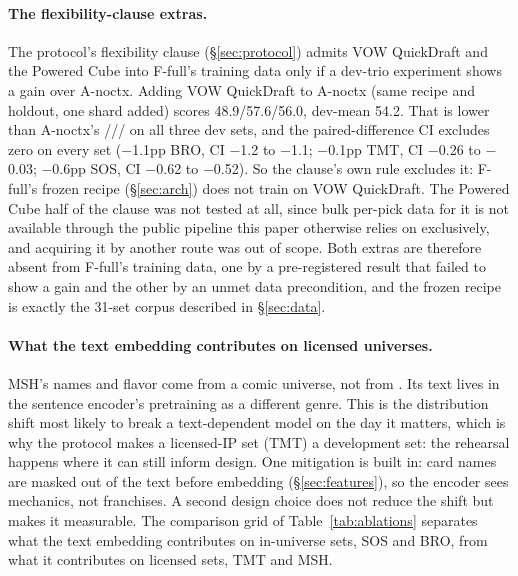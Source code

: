 \paragraph{The flexibility-clause extras.} %
The protocol's flexibility clause (\S\ref{sec:protocol}) admits VOW
QuickDraft and the Powered Cube into F-full's training data only if a
dev-trio experiment shows a gain over A-noctx. Adding VOW QuickDraft to
A-noctx (same recipe and holdout, one shard added) scores 48.9/57.6/56.0,
dev-mean 54.2. That is lower than A-noctx's
\ANoctxBro/\ANoctxTmt/\ANoctxSos/\ANoctxDevMean{} on all three dev sets,
and the paired-difference CI excludes zero on every set ($-$1.1pp BRO, CI
$-$1.2 to $-$1.1; $-$0.1pp TMT, CI $-$0.26 to $-$0.03; $-$0.6pp SOS, CI
$-$0.62 to $-$0.52). So the clause's own rule excludes it: F-full's frozen
recipe (\S\ref{sec:arch}) does not train on VOW QuickDraft. The Powered
Cube half of the clause was not tested at all, since bulk per-pick data
for it is not available through the public \seventeenlands{} pipeline this
paper otherwise relies on exclusively, and acquiring it by another route
was out of scope. Both extras are therefore absent from F-full's training
data, one by a pre-registered result that failed to show a gain and the
other by an unmet data precondition, and the frozen recipe is exactly the
31-set corpus described in \S\ref{sec:data}.

\paragraph{What the text embedding contributes on licensed universes.}
MSH's names and flavor come from a comic universe, not from \mtg{}. Its
text lives in the sentence encoder's pretraining as a different genre.
This is the distribution shift most likely to break a text-dependent
model on the day it matters, which is why the protocol makes a
licensed-IP set (TMT) a development set: the rehearsal happens where it
can still inform design. One mitigation is built in: card names are
masked out of the text before embedding (\S\ref{sec:features}), so the
encoder sees mechanics, not franchises. A second design choice does not
reduce the shift but makes it measurable. The comparison grid of
Table~\ref{tab:ablations} separates what the text embedding contributes
on in-universe sets, SOS and BRO, from what it contributes on licensed
sets, TMT and MSH.


